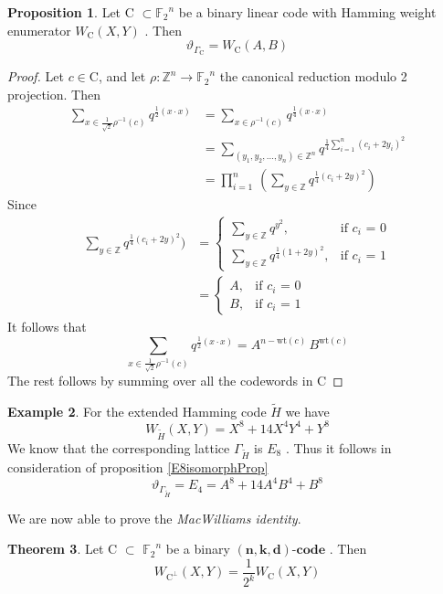 \documentclass[12pt]{article}
\theoremstyle{definition}
\newtheorem{theorem}{Theorem}[section]
\newtheorem{example}[theorem]{Example}
\newtheorem{prop}[theorem]{Proposition}
\numberwithin{equation}{theorem}
\numberwithin{figure}{theorem}
\newcommand{\Ftwo}{\ensuremath{\mathbb{F}_2}}
\newcommand{\simpleCodes}{\ensuremath{\mathrm{C}}}
\newcommand{\buildVertical}[1]{\ensuremath{#1^{\bot}}}
\newcommand{\buildLattice}[1]{\ensuremath{\Gamma_{#1}}}
\newcommand{\weightEnumerator}[3]{\ensuremath{W_{#1}(#2,#3)}}
\newcommand{\thetaFunction}[1]{\ensuremath{\vartheta_{#1}}}
\newcommand{\linearCode}[3]{\ensuremath{\bm{(#1,#2,#3)\mbox{-}code}}}
\newcommand{\wt}[1]{\ensuremath{\text{wt}(#1)}}
\newcommand{\Integer}{\ensuremath{\mathbb{Z}}}
\begin{document}
\begin{prop}\label{ABHammingProp}
Let {\simpleCodes} $\subset \Ftwo^n$ be a binary linear code with Hamming weight enumerator {\weightEnumerator{\simpleCodes}{X}{Y}} . Then
\[
	\thetaFunction{\buildLattice{\simpleCodes}} = \weightEnumerator{\simpleCodes}{A}{B}
\]
\end{prop}
\begin{proof}
Let $c \in \simpleCodes$, and let $\rho : \Integer^n \rightarrow \Ftwo^n$ the canonical reduction modulo 2 projection. Then
\begin{align*}
	\sum_{x \in \frac{1}{\sqrt{2}}\rho^{-1}(c)} q^{\frac{1}{2}(x\cdot x)} &= \sum_{x \in \rho^{-1}(c)} q^{\frac{1}{4}(x\cdot x)}\\
	&= \sum_{(y_1,y_2,\ldots,y_n) \in \Integer^n}q^{\frac{1}{4}\sum_{i = 1}^{n}(c_i + 2y_i)^2}\\
	&= \prod_{i = 1}^{n}\,(\sum_{y\in \Integer}q^{\frac{1}{4}(c_i + 2y)^2})
\end{align*}
Since
\begin{align*}
\sum_{y\in \Integer}q^{\frac{1}{4}(c_i + 2y)^2}) &= 
	\begin{cases}
	\sum_{y\in \Integer}q^{y^2}, &\text{if $c_i$ = 0}\\
	\sum_{y\in \Integer}q^{\frac{1}{4}(1 + 2y)^2}, &\text{if $c_i$ = 1} 
	\end{cases}\\
	&= 
	\begin{cases}
	A, &\text{if $c_i$ = 0} \\
	B, &\text{if $c_i$ = 1}
	\end{cases}
\end{align*}
It follows that
\[
\sum_{x \in \frac{1}{\sqrt{2}}\rho^{-1}(c)} q^{\frac{1}{2}(x\cdot x)} = A^{n - \wt{c}}\,B^{\wt{c}}
\] 
The rest follows by summing over all the codewords in $\simpleCodes$
\end{proof}
\begin{example}\label{e8Example}
For the extended Hamming code $\widetilde{H}$ we have
\[
\weightEnumerator{\widetilde{H}}{X}{Y} = X^8 + 14X^4Y^4 + Y^8
\]
We know that the corresponding lattice $\buildLattice{\widetilde{H}}$ is $E_8$ .
Thus it follows in consideration of proposition \ref{E8isomorphProp}
\[
	\thetaFunction{\buildLattice{\widetilde{H}}} = E_4 = A^8 + 14A^4B^4 + B^8
\]
\end{example}
We are now able to prove the \emph{MacWilliams identity}.
\begin{theorem}\label{MacWilliamsTheorem}
Let {\simpleCodes} $\subset$ $\Ftwo^n$ be a binary \linearCode{n}{k}{d} . Then
\[
	\weightEnumerator{\buildVertical{\simpleCodes}}{X}{Y} = \frac{1}{2^k} \weightEnumerator{\simpleCodes}{X}{Y}
\]
\end{theorem}
\end{document}
